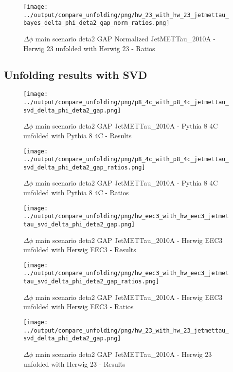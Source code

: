 \documentclass[11pt]{book}
\begin{document}
\begin{figure}[ht]
\centering
\texttt{[image: ../output/compare\_unfolding/png/hw\_23\_with\_hw\_23\_jetmettau\_bayes\_delta\_phi\_deta2\_gap\_norm\_ratios.png]}
\caption{$\Delta\phi$ main scenario deta2 GAP Normalized JetMETTau\_2010A - Herwig 23 unfolded with Herwig 23 - Ratios}
\label{hw_23_hw_23_jetmettau_bayes_delta_phi_deta2_gap_norm_b}
\end{figure}


\clearpage
\subsection{Unfolding results with SVD}

\begin{figure}[ht]
\centering
\texttt{[image: ../output/compare\_unfolding/png/p8\_4c\_with\_p8\_4c\_jetmettau\_svd\_delta\_phi\_deta2\_gap.png]}
\caption{$\Delta\phi$ main scenario deta2 GAP JetMETTau\_2010A - Pythia 8 4C unfolded with Pythia 8 4C - Results}
\label{p8_p8_jetmettau_svd_delta_phi_deta2_gap_a}
\end{figure}

\begin{figure}[ht]
\centering
\texttt{[image: ../output/compare\_unfolding/png/p8\_4c\_with\_p8\_4c\_jetmettau\_svd\_delta\_phi\_deta2\_gap\_ratios.png]}
\caption{$\Delta\phi$ main scenario deta2 GAP JetMETTau\_2010A - Pythia 8 4C unfolded with Pythia 8 4C - Ratios}
\label{p8_p8_jetmettau_svd_delta_phi_deta2_gap_b}
\end{figure}

\begin{figure}[ht]
\centering
\texttt{[image: ../output/compare\_unfolding/png/hw\_eec3\_with\_hw\_eec3\_jetmettau\_svd\_delta\_phi\_deta2\_gap.png]}
\caption{$\Delta\phi$ main scenario deta2 GAP JetMETTau\_2010A - Herwig EEC3 unfolded with Herwig EEC3 - Results}
\label{hw_eec3_hw_eec3_jetmettau_svd_delta_phi_deta2_gap_a}
\end{figure}

\begin{figure}[ht]
\centering
\texttt{[image: ../output/compare\_unfolding/png/hw\_eec3\_with\_hw\_eec3\_jetmettau\_svd\_delta\_phi\_deta2\_gap\_ratios.png]}
\caption{$\Delta\phi$ main scenario deta2 GAP JetMETTau\_2010A - Herwig EEC3 unfolded with Herwig EEC3 - Ratios}
\label{hw_eec3_hw_eec3_jetmettau_svd_delta_phi_deta2_gap_b}
\end{figure}

\begin{figure}[ht]
\centering
\texttt{[image: ../output/compare\_unfolding/png/hw\_23\_with\_hw\_23\_jetmettau\_svd\_delta\_phi\_deta2\_gap.png]}
\caption{$\Delta\phi$ main scenario deta2 GAP JetMETTau\_2010A - Herwig 23 unfolded with Herwig 23 - Results}
\label{hw_23_hw_23_jetmettau_svd_delta_phi_deta2_gap_a}
\end{figure}
\end{document}
